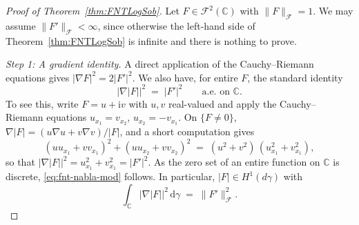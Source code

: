 \documentclass[11pt]{amsart}
\theoremstyle{remark}
\newcommand{\C}{\mathbb{C}}
\newcommand{\abs}[1]{\lvert #1 \rvert}
\newcommand{\norm}[1]{\lVert #1 \rVert}
\newcommand{\dd}{\mathrm{d}}
\newcommand{\ii}{\mathrm{i}}
\begin{document}
\begin{proof}[Proof of Theorem~\ref{thm:FNTLogSob}]
Let $F \in \mathcal{F}^2(\C)$ with $\norm{F}_{\mathcal{F}} = 1$.
We may assume $\norm{F'}_{\mathcal{F}} < \infty$, since otherwise the
left-hand side of Theorem~\ref{thm:FNTLogSob} is infinite and there is nothing
to prove.
 \vspace{0.5em}

\noindent
\emph{Step 1: A gradient identity.}\;
A direct application of the Cauchy--Riemann equations
gives $\abs{\nabla F}^2 = 2 \abs{F'}^2$.  We also have, for
entire $F$, the standard identity
\begin{equation}\label{eq:fnt-nabla-mod}
\abs{\nabla \abs{F}}^2
\;=\; \abs{F'}^2 \qquad \text{a.e. on } \C.
\end{equation}
To see this,  write $F = u + \ii v$ with $u, v$ real-valued and apply the Cauchy--Riemann
equations $u_{x_1} = v_{x_2}$, $u_{x_2} = -v_{x_1}$.  On $\{F \neq 0\}$,
$\nabla \abs{F} = (u \nabla u + v \nabla v) / \abs{F}$, and a
short computation gives
\[
(u u_{x_1} + v v_{x_1})^2
+ (u u_{x_2} + v v_{x_2})^2
\;=\; (u^2 + v^2)\, (u_{x_1}^2 + v_{x_1}^2),
\]
so that
$\abs{\nabla \abs{F}}^2
= u_{x_1}^2 + v_{x_1}^2 = \abs{F'}^2$.
As the zero set of an entire function on $\mathbb{C}$ is discrete, \eqref{eq:fnt-nabla-mod} follows. In particular,
$\abs{F} \in H^1(d\gamma)$ with
\begin{equation}\label{eq:fnt-mod-energy}
\int_{\C} \abs{\nabla \abs{F}}^2\, \dd\gamma
\;=\; \norm{F'}_{\mathcal{F}}^2.
\end{equation}



\end{proof}
\end{document}
